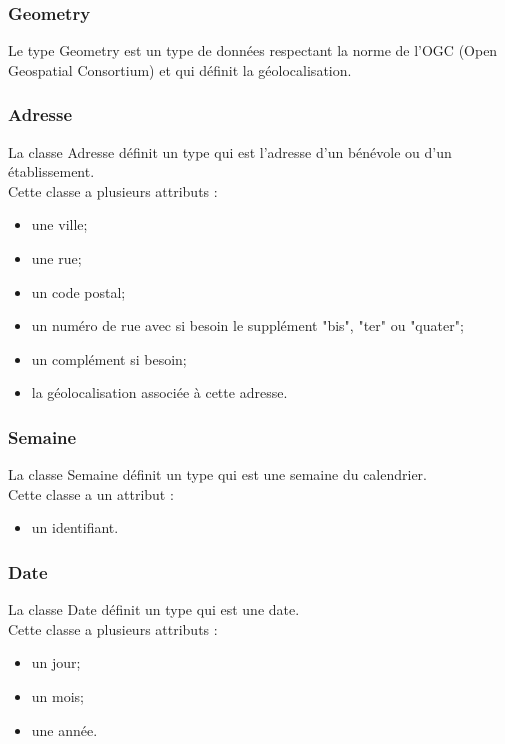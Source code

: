 \subsubsection*{Geometry}

Le type Geometry est un type de données respectant la norme de l'OGC (Open Geospatial Consortium) et qui définit la géolocalisation.

\subsubsection*{Adresse}

La classe Adresse définit un type qui est l'adresse d'un bénévole ou d'un établissement.\\
Cette classe a plusieurs attributs : 
\begin{itemize}
\item une ville;
\item une rue;
\item un code postal;
\item un numéro de rue avec si besoin le supplément "bis", "ter" ou "quater";
\item un complément si besoin;
\item la géolocalisation associée à cette adresse.
\end{itemize}

\subsubsection*{Semaine}

La classe Semaine définit un type qui est une semaine du calendrier.\\
Cette classe a un attribut : 
\begin{itemize}
\item un identifiant.
\end{itemize}

\subsubsection*{Date}

La classe Date définit un type qui est une date.\\
Cette classe a plusieurs attributs : 
\begin{itemize}
\item un jour;
\item un mois;
\item une année.
\end{itemize}

